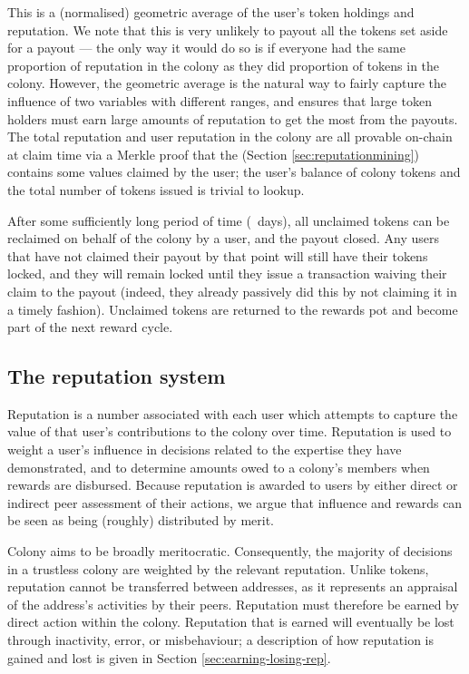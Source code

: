 This is a (normalised) geometric average of the user's token holdings and reputation. We note that this is very unlikely to payout all the tokens set aside for a payout --- the only way it would do so is if everyone had the same proportion of reputation in the colony as they did proportion of tokens in the colony. However, the geometric average is the natural way to fairly capture the influence of two variables with different ranges, and ensures that large token holders must earn large amounts of reputation to get the most from the payouts. The total reputation and user reputation in the colony are all provable on-chain at claim time via a Merkle proof that the  (Section \ref{sec:reputationmining}) contains some values claimed by the user; the user's balance of colony tokens and the total number of tokens issued is trivial to lookup.

After some sufficiently long period of time (\rewardclaimduration\ days), all unclaimed tokens can be reclaimed on behalf of the colony by a user, and the payout closed. Any users that have not claimed their payout by that point will still have their tokens locked, and they will remain locked until they issue a transaction waiving their claim to the payout (indeed, they already passively did this by not claiming it in a timely fashion). Unclaimed tokens are returned to the rewards pot and become part of the next reward cycle.

\subsection{The reputation system}\label{sec:reputation}

Reputation is a number associated with each user which attempts to capture the value of that user's contributions to the colony over time. Reputation is used to weight a user's influence in decisions related to the expertise they have demonstrated, and to determine amounts owed to a colony's members when rewards are disbursed. Because reputation is awarded to users by either direct or indirect peer assessment of their actions, we argue that influence and rewards can be seen as being (roughly) distributed by merit.

Colony aims to be broadly meritocratic. Consequently, the majority of decisions in a trustless colony are weighted by the relevant reputation. Unlike tokens, reputation cannot be transferred between addresses, as it represents an appraisal of the address's activities by their peers. Reputation must therefore be earned by direct action within the colony. Reputation that is earned will eventually be lost through inactivity, error, or misbehaviour; a description of how reputation is gained and lost is given in Section \ref{sec:earning-losing-rep}.


